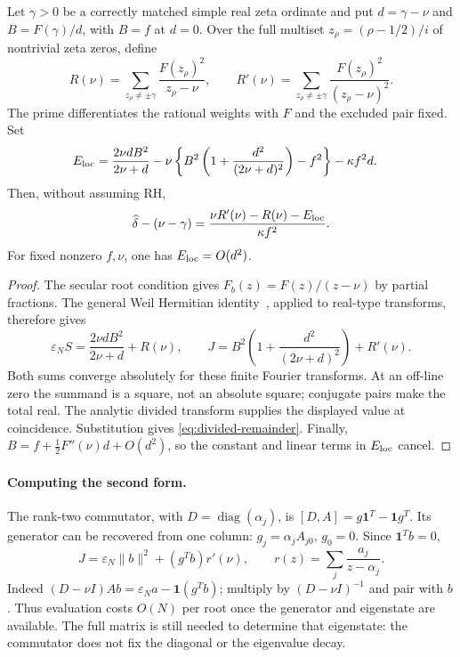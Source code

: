 \begin{proposition}
\label{prop:divided-correction}
Let $\gamma>0$ be a correctly matched simple real zeta ordinate and put
$d=\gamma-\nu$ and $B=F(\gamma)/d$, with $B=f$ at $d=0$.
Over the full multiset $z_\rho=(\rho-1/2)/i$ of nontrivial zeta zeros,
define
\[
 R(\nu)=\sum_{z_\rho\ne\pm\gamma}
         \frac{F(z_\rho)^2}{z_\rho-\nu},\qquad
 R'(\nu)=\sum_{z_\rho\ne\pm\gamma}
         \frac{F(z_\rho)^2}{(z_\rho-\nu)^2}.
\]
The prime differentiates the rational weights with $F$ and the excluded
pair fixed. Set
\begin{align}
 E_{\rm loc}={}&\frac{2\nu dB^2}{2\nu+d}
   -\nu\left\{B^2\left(1+\frac{d^2}{(2\nu+d)^2}\right)-f^2\right\}
   -\kappa f^2d.\label{eq:divided-local}
\end{align}
Then, without assuming RH,
\begin{equation}\label{eq:divided-remainder}
 \widehat\delta-(\nu-\gamma)
 =\frac{\nu R'(\nu)-R(\nu)-E_{\rm loc}}{\kappa f^2}.
\end{equation}
For fixed nonzero $f,\nu$, one has $E_{\rm loc}=O(d^2)$.
\end{proposition}
\begin{proof}
The secular root condition gives
$F_b(z)=F(z)/(z-\nu)$ by partial fractions. The general Weil Hermitian
identity~\cite[Section~1.2]{AlpogeFurman2026}, applied to real-type transforms,
therefore gives
\[
 \varepsilon_NS=\frac{2\nu d B^2}{2\nu+d}+R(\nu),\qquad
 J=B^2\left(1+\frac{d^2}{(2\nu+d)^2}\right)+R'(\nu).
\]
Both sums converge absolutely for these finite Fourier transforms. At an
off-line zero the summand is a square, not an absolute square; conjugate
pairs make the total real. The analytic divided transform supplies the
displayed value at coincidence. Substitution gives
\eqref{eq:divided-remainder}. Finally,
$B=f+\tfrac12F''(\nu)d+O(d^2)$, so the constant and linear terms in
$E_{\rm loc}$ cancel.
\end{proof}

\paragraph{Computing the second form.}
The rank-two commutator, with $D=\operatorname{diag}(\alpha_j)$,
is $[D,A]=g\mathbf1^T-\mathbf1g^T$. Its generator can be recovered from
one column: $g_j=\alpha_jA_{j0}$, $g_0=0$. Since $\mathbf1^Tb=0$,
\begin{equation}\label{eq:divided-fastform}
 J=\varepsilon_N\|b\|^2+(g^Tb)r'(\nu),\qquad
 r(z)=\sum_j\frac{a_j}{z-\alpha_j}.
\end{equation}
Indeed $(D-\nu I)Ab=\varepsilon_Na-\mathbf1(g^Tb)$; multiply by
$(D-\nu I)^{-1}$ and pair with $b$. Thus evaluation costs $O(N)$ per
root once the generator and eigenstate are available. The full matrix is
still needed to determine that eigenstate: the commutator does not fix
the diagonal or the eigenvalue decay.

